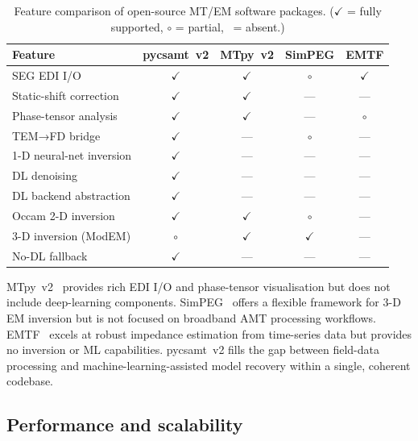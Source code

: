 \documentclass[review,12pt]{elsarticle}
\begin{document}
\begin{table}[htbp]
\centering
\caption{Feature comparison of open-source MT/EM software packages.
  ($\checkmark$ = fully supported, $\circ$ = partial, \textemdash\ = absent.)}
\label{tab:comparison}
\small
\begin{tabular}{lcccc}
\toprule
Feature & pycsamt~v2 & MTpy~v2 & SimPEG & EMTF\\
\midrule
SEG EDI I/O            & $\checkmark$ & $\checkmark$ & $\circ$  & $\checkmark$ \\
Static-shift correction& $\checkmark$ & $\checkmark$ & ---      & ---          \\
Phase-tensor analysis  & $\checkmark$ & $\checkmark$ & ---      & $\circ$      \\
TEM→FD bridge          & $\checkmark$ & ---          & $\circ$  & ---          \\
1-D neural-net inversion& $\checkmark$& ---          & ---      & ---          \\
DL denoising           & $\checkmark$ & ---          & ---      & ---          \\
DL backend abstraction & $\checkmark$ & ---          & ---      & ---          \\
Occam 2-D inversion    & $\checkmark$ & $\checkmark$ & $\circ$  & ---          \\
3-D inversion (ModEM)  & $\circ$      & $\checkmark$ & $\checkmark$ & ---      \\
No-DL fallback         & $\checkmark$ & ---          & ---      & ---          \\
\bottomrule
\end{tabular}
\end{table}

MTpy~v2~\citep{Kirkby2019} provides rich EDI I/O and
phase-tensor visualisation but does not include deep-learning
components.
SimPEG~\citep{Cockett2015} offers a flexible framework for 3-D EM
inversion but is not focused on broadband AMT processing workflows.
EMTF~\citep{Egbert1997} excels at robust impedance estimation from
time-series data but provides no inversion or ML capabilities.
pycsamt~v2 fills the gap between field-data processing and
machine-learning-assisted model recovery within a single, coherent
codebase.

\subsection{Performance and scalability}
\label{sec:performance}
\end{document}
